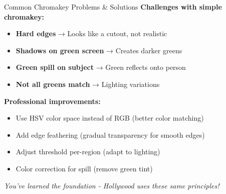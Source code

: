 \documentclass{csbeamer}
\begin{document}
\begin{frame}{Common Chromakey Problems \& Solutions}
    \textbf{Challenges with simple chromakey:}

    \vspace{1em}

    \begin{itemize}
        \item \textbf{Hard edges} → Looks like a cutout, not realistic
        \item \textbf{Shadows on green screen} → Creates darker greens
        \item \textbf{Green spill on subject} → Green reflects onto person
        \item \textbf{Not all greens match} → Lighting variations
    \end{itemize}

    \vspace{1em}

    \textbf{Professional improvements:}
    \begin{itemize}
        \item Use HSV color space instead of RGB (better color matching)
        \item Add edge feathering (gradual transparency for smooth edges)
        \item Adjust threshold per-region (adapt to lighting)
        \item Color correction for spill (remove green tint)
    \end{itemize}

    \vspace{1em}

    \textit{You've learned the foundation - Hollywood uses these same principles!}
\end{frame}
\end{document}
